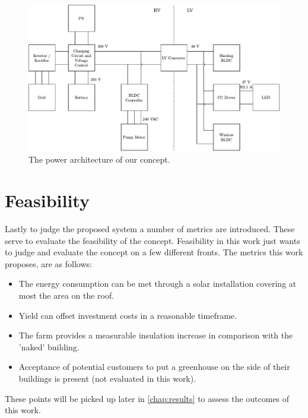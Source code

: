 \begin{figure}[htbp]
  \centering
  \includegraphics[width=\textwidth]{img/power-architecture.pdf}
  \caption{The power architecture of our concept.}
  \label{fig:power-architecture}
\end{figure}

\section{Feasibility}
\label{sec:feasibility}
Lastly to judge the proposed system a number of metrics are introduced.
These serve to evaluate the feasibility of the concept.
Feasibility in this work just wants to judge and evaluate the concept on a few different fronts.
The metrics this work proposes, are as follows:
\begin{itemize}
	\item The energy consumption can be met through a solar installation covering at most the area on the roof.
	\item Yield can offset investment costs in a reasonable timeframe.
	\item The farm provides a measurable insulation increase in comparison with the 'naked' building.
	\item Acceptance of potential customers to put a greenhouse on the side of their buildings is present (not evaluated in this work).
\end{itemize}
These points will be picked up later in \ref{chap:results} to assess the outcomes of this work.

